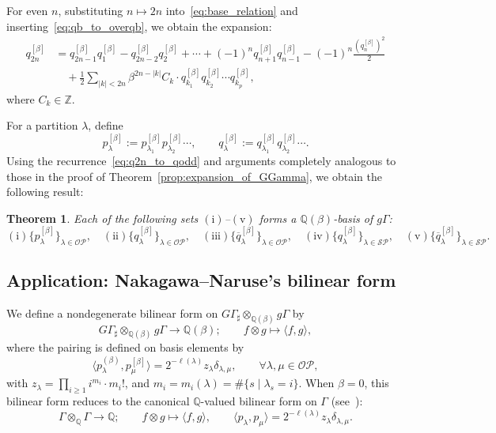 \documentclass[dvipdfmx]{amsart}
\newtheorem{thm}{Theorem}[section]
\theoremstyle{definition}
\theoremstyle{remark}
\begin{document}
For even \( n \), substituting \( n \mapsto 2n \) into~\eqref{eq:base_relation} and inserting~\eqref{eq:qb_to_overqb}, we obtain the expansion:
\begin{equation}\label{eq:q2n_to_qodd}
\begin{aligned}
q_{2n}^{[\beta]} &=
q_{2n-1}^{[\beta]} q_1^{[\beta]} - q_{2n-2}^{[\beta]} q_2^{[\beta]} + \cdots
+ (-1)^n q_{n+1}^{[\beta]} q_{n-1}^{[\beta]} - (-1)^n \frac{(q_n^{[\beta]})^2}{2} \\
& \quad + \frac{1}{2} \sum_{|k| < 2n} \beta^{2n - |k|} C_k \cdot 
q_{k_1}^{[\beta]} q_{k_2}^{[\beta]} \cdots q_{k_p}^{[\beta]},
\end{aligned}
\end{equation}
where \( C_k \in \mathbb{Z} \).

For a partition \( \lambda \), define
\[
p_\lambda^{[\beta]} := p_{\lambda_1}^{[\beta]} p_{\lambda_2}^{[\beta]} \cdots, \qquad
q_\lambda^{[\beta]} := q_{\lambda_1}^{[\beta]} q_{\lambda_2}^{[\beta]} \cdots.
\]
Using the recurrence~\eqref{eq:q2n_to_qodd} and arguments completely analogous to those in the proof of Theorem~\ref{prop:expansion_of_GGamma}, we obtain the following result:

\begin{thm}\label{prop:expansion_of_gGamma}
Each of the following sets \( \mathrm{(i)} \)–\( \mathrm{(v)} \) forms a \( \mathbb{Q}(\beta) \)-basis of \( g\Gamma \):
\[
\mathrm{(i)} \{ p_\lambda^{[\beta]} \}_{\lambda \in \mathcal{OP}},\quad
\mathrm{(ii)} \{ q_\lambda^{[\beta]} \}_{\lambda \in \mathcal{OP}},\quad
\mathrm{(iii)} \{ \overline{q}_\lambda^{[\beta]} \}_{\lambda \in \mathcal{OP}},\quad
\mathrm{(iv)} \{ q_\lambda^{[\beta]} \}_{\lambda \in \mathcal{SP}},\quad
\mathrm{(v)}\{ \overline{q}_\lambda^{[\beta]} \}_{\lambda \in \mathcal{SP}}.
\]
\end{thm}

\subsection{Application: Nakagawa–Naruse's bilinear form}\label{sec:dual_speces}

We define a nondegenerate bilinear form on \( G\Gamma_\sharp \otimes_{\mathbb{Q}(\beta)} g\Gamma \) by
\begin{equation}\label{eq:def_of_bilin}
G\Gamma_\sharp \otimes_{\mathbb{Q}(\beta)} g\Gamma \to \mathbb{Q}(\beta); \qquad 
f \otimes g \mapsto \langle f, g \rangle,
\end{equation}
where the pairing is defined on basis elements by
\[
\langle p_\lambda^{(\beta)}, p_\mu^{[\beta]} \rangle = 2^{-\ell(\lambda)} z_\lambda \delta_{\lambda,\mu}, \qquad \forall \lambda, \mu \in \mathcal{OP},
\]
with \( z_\lambda = \prod_{i \geq 1} i^{m_i} \cdot m_i! \), and \( m_i = m_i(\lambda) = \#\{ s \mid \lambda_s = i \} \).
When \( \beta = 0 \), this bilinear form reduces to the canonical \( \mathbb{Q} \)-valued bilinear form on \( \Gamma \) (see~\cite[\S III-8]{macbook}):
\[
\Gamma \otimes_{\mathbb{Q}} \Gamma \to \mathbb{Q}; \qquad 
f \otimes g \mapsto \langle f, g \rangle, \qquad 
\langle p_\lambda, p_\mu \rangle = 2^{-\ell(\lambda)} z_\lambda \delta_{\lambda,\mu}.
\]
\end{document}

